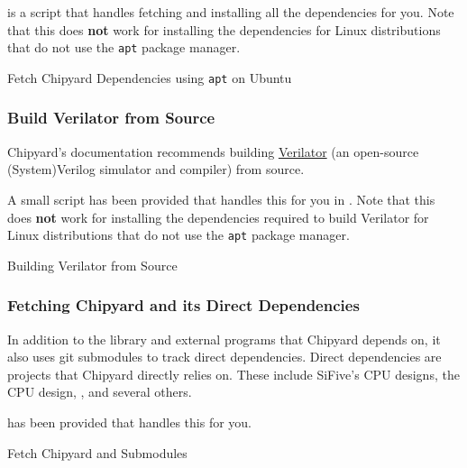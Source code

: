  is a script that handles fetching and installing all the dependencies for you.
Note that this does \textbf{not} work for installing the dependencies for Linux distributions that do not use the \texttt{apt} package manager.

\begin{listing}[h!tbp]
\caption{Fetch Chipyard Dependencies using \texttt{apt} on Ubuntu}
\label{lst:Ubuntu_Chipyard_Deps_Setup}
\end{listing}

\subsubsection{Build Verilator from Source}\label{sec:Build_Verilator_from_Source}
Chipyard's documentation recommends building \href{https://www.veripool.org/wiki/verilator}{Verilator} (an open-source (System)Verilog simulator and compiler) from \gls{source}.

A small script has been provided that handles this for you in .
Note that this does \textbf{not} work for installing the dependencies required to build Verilator for Linux distributions that do not use the \texttt{apt} package manager.

\begin{listing}[h!tbp]
\caption{Building Verilator from Source}
\label{lst:Build_Verilator_from_Source}
\end{listing}

\subsubsection{Fetching Chipyard and its Direct Dependencies}\label{sec:Fetching_Chipyard_Direct_Dependencies}
In addition to the library and external programs that Chipyard depends on, it also uses git submodules to track direct dependencies.
Direct dependencies are projects that Chipyard directly relies on.
These include SiFive's CPU designs, the  CPU design, , and several others.

 has been provided that handles this for you.

\begin{listing}[h!tbp]
\caption{Fetch Chipyard and Submodules}
\label{lst:Fetch_Chipyard_and_Submodules}
\end{listing}

